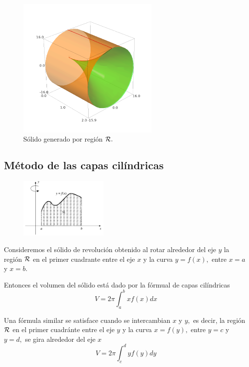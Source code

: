 \begin{figure}
 \centering
 \includegraphics[height=7cm]{./calculo/sage0504.png}
 \caption{S\'olido generado por regi\'on $\mathcal{R}.$}
 \label{fig:sage:0504}
\end{figure}



\subsection{M\'etodo de las capas cil\'indricas}


\begin{figure}
 \centering
 \includegraphics[height=3cm,keepaspectratio=true]{./calculo/fig3007.png}
 \label{fig:3007}
\end{figure}

Consideremos el s\'olido de revoluci\'on obtenido al rotar alrededor del eje $y$ la regi\'on $\mathcal{R}$ en el primer cuadrante entre el eje $x$ y la curva $y=f(x),$ entre $x=a$ y $x=b.$

Entonces el volumen del s\'olido está dado por la f\'ormual de capas cil\'indricas
\[
 \label{FCC}
 \tag{FCC}
 V=2\pi \int_{a}^{b}xf(x)dx
\]




Una f\'ormula similar se satisface cuando se intercambian $x$ y $y,$ es decir, la regi\'on $\mathcal{R}$ en el primer cuadránte entre el eje $y$ y la curva $x=f(y),$ entre $y=c$ y $y=d,$ se gira alrededor del eje $x$
\[
 \label{FCC:2}
 \tag{FCC(II)}
 V=2\pi \int_{c}^{d}yf(y)dy
\]



